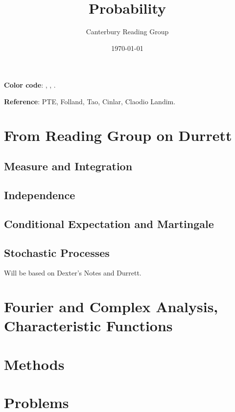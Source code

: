 \documentclass[12pt, oneside]{book}
\begin{document}
    \title{Probability}\author{Canterbury Reading Group}\date{\today}
    \setcounter{tocdepth}{3}
    \tableofcontents

    \textbf{Color code}: , , . 

    \textbf{Reference}: PTE, Folland, Tao, Cinlar, Claodio Landim.
    \chapter{From Reading Group on Durrett}  
        \section{Measure and Integration}
        \section{Independence}
        \section{Conditional Expectation and Martingale}
        \section{Stochastic Processes}Will be based on Dexter's Notes and Durrett.
    \appendix 
    \chapter{Fourier and Complex Analysis, Characteristic Functions}
    \chapter{Methods}
    \chapter{Problems}
\end{document}
